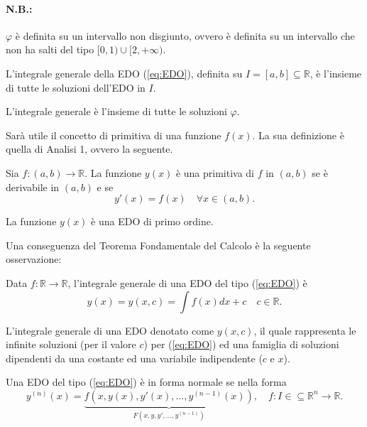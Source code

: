 \paragraph{N.B.:} $\varphi$ è definita su un intervallo non disgiunto, ovvero è definita su un intervallo che non ha salti del tipo $[0,1)\cup[2, +\infty)$.

\begin{definition}\label{def:integrale_generale_EDO}
    L'integrale generale della EDO (\ref{eq:EDO}), definita su $I=[a,b]\subseteq \mathbb R$, è l'insieme di tutte le soluzioni dell'EDO in $I$.
\end{definition}

L'integrale generale è l'insieme di tutte le soluzioni $\varphi$.

Sarà utile il concetto di primitiva di una funzione $f(x)$. La sua definizione è quella di Analisi 1, ovvero la seguente.

\begin{definition}[Primitiva]
    Sia $f\colon (a,b)\rightarrow\mathbb R$. La funzione $y(x)$ è una primitiva di $f$ in $(a,b)$ se è derivabile in $(a,b)$ e se
    \begin{equation*}
        y'(x)=f(x)\quad\forall x\in(a,b).
    \end{equation*}
\end{definition}

La funzione $y(x)$ è una EDO di primo ordine.

Una conseguenza del Teorema Fondamentale del Calcolo è la seguente osservazione:
\begin{remark}
    Data $f\colon\mathbb R \rightarrow \mathbb R$, l'integrale generale di una EDO del tipo (\ref{eq:EDO}) è
    \begin{equation}\label{eq:primitiva}
        y(x)=y(x,c)=\int f(x) dx+c\quad c\in\mathbb R.
    \end{equation}
\end{remark} 

L'integrale generale di una EDO denotato come $y(x,c)$, il quale rappresenta le infinite soluzioni (per il valore $c$) per (\ref{eq:EDO}) ed una famiglia di soluzioni dipendenti da una costante ed una variabile indipendente ($c$ e $x$).

\begin{definition}
    Una EDO del tipo (\ref{eq:EDO}) è in forma normale se nella forma
    \begin{equation}\label{eq:EDO_forma_normale}
        y^{(n)}(x)=\underbrace{f(x, y(x), y'(x),\hdots,y^{(n-1)}(x))}_{F(x, y, y',\hdots, y^{(n-1)})}, \quad f\colon I\in\subseteq\mathbb R^{n}\rightarrow\mathbb R.
    \end{equation}
\end{definition}

